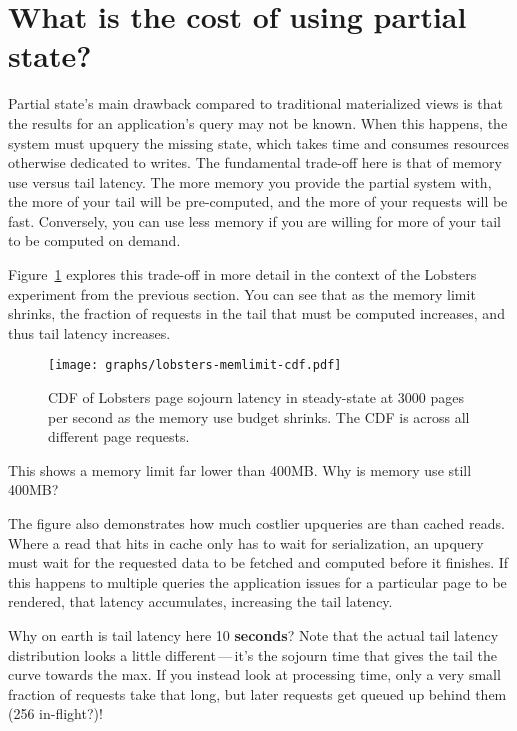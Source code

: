 \section{What is the cost of using partial state?}
\label{s:eval:cost}

Partial state's main drawback compared to traditional materialized views is
that the results for an application's query may not be known. When this happens,
the system must upquery the missing state, which takes time and consumes
resources otherwise dedicated to writes. The fundamental trade-off here is that
of memory use versus tail latency. The more memory you provide the partial
system with, the more of your tail will be pre-computed, and the more of your
requests will be fast. Conversely, you can use less memory if you are willing
for more of your tail to be computed on demand.

Figure~\ref{f:lobsters-mem-latency} explores this trade-off in more detail in
the context of the Lobsters experiment from the previous section. You can see
that as the memory limit shrinks, the fraction of requests in the tail that must
be computed increases, and thus tail latency increases.

\begin{figure}[h]
  \centering
  \texttt{[image: graphs/lobsters-memlimit-cdf.pdf]}
  \caption{CDF of Lobsters page sojourn latency in steady-state at 3000 pages
  per second as the memory use budget shrinks. The CDF is across all different
  page requests.}
  \label{f:lobsters-mem-latency}
\end{figure}

\begin{inprogress}
  This shows a memory limit far lower than 400MB. Why is memory use still 400MB?
\end{inprogress}

The figure also demonstrates how much costlier upqueries are than cached
reads. Where a read that hits in cache only has to wait for serialization, an
upquery must wait for the requested data to be fetched and computed before it
finishes. If this happens to multiple queries the application issues for a
particular page to be rendered, that latency accumulates, increasing the tail
latency.

\begin{inprogress}
  Why on earth is tail latency here 10 \textbf{seconds}?
  Note that the actual tail latency distribution looks a little
  different\,---\,it's the sojourn time that gives the tail the curve towards
  the max. If you instead look at processing time, only a very small fraction of
  requests take that long, but later requests get queued up behind them (256
  in-flight?)!
\end{inprogress}

